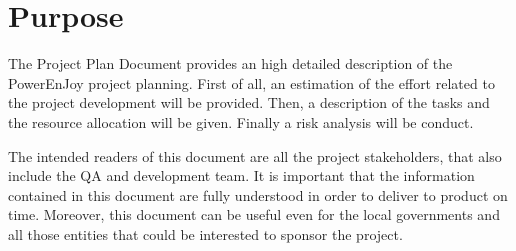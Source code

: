 \section{Purpose}
The Project Plan Document provides an high detailed description of the PowerEnJoy project planning. First of all, an estimation of the effort related to the project development will be provided. Then, a description of the tasks and the resource allocation will be given. Finally a risk analysis will be conduct. 

The intended readers of this document are all the project stakeholders, that also include the QA and development team. It is important that the information contained in this document are fully understood in order to deliver to product on time. Moreover, this document can be useful even for the local governments and all those entities that could be interested to sponsor the project.